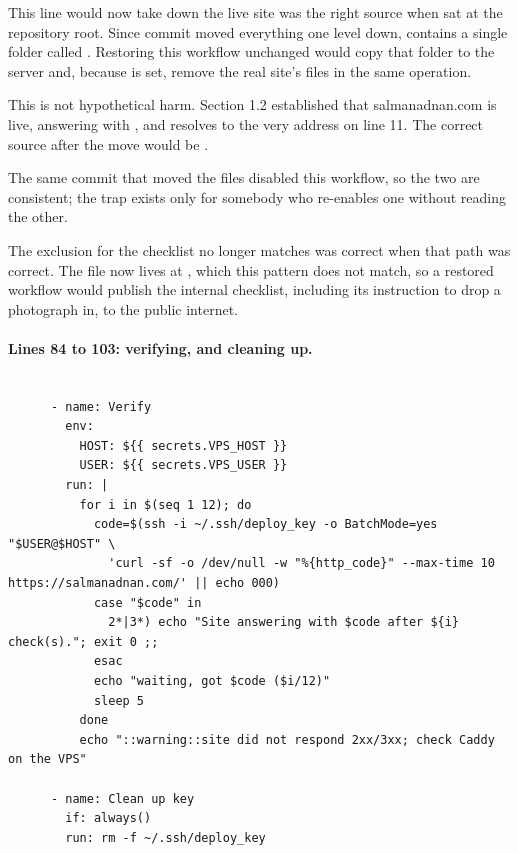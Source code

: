 \begin{honest}{This line would now take down the live site}
 was the right source when  sat at the repository root.
Since commit  moved everything one level down,  contains a
single folder called . Restoring this workflow unchanged
would copy that folder to the server and, because  is set, remove the
real site's files in the same operation.

This is not hypothetical harm. Section 1.2 established that salmanadnan.com is live,
answering with , and resolves to the very address on line 11. The correct
source after the move would be .

The same commit that moved the files disabled this workflow, so the two are
consistent; the trap exists only for somebody who re-enables one without reading the
other.
\end{honest}

\begin{honest}{The exclusion for the checklist no longer matches}
 was correct when that path was correct. The file
now lives at , which this pattern does
not match, so a restored workflow would publish the internal checklist, including
its instruction to drop a photograph in, to the public internet.
\end{honest}

\paragraph{Lines 84 to 103: verifying, and cleaning up.}

\begin{lstlisting}[firstnumber=84,caption={\file{deploy.yml.disabled}, lines 84--103}]

      - name: Verify
        env:
          HOST: ${{ secrets.VPS_HOST }}
          USER: ${{ secrets.VPS_USER }}
        run: |
          for i in $(seq 1 12); do
            code=$(ssh -i ~/.ssh/deploy_key -o BatchMode=yes "$USER@$HOST" \
              'curl -sf -o /dev/null -w "%{http_code}" --max-time 10 https://salmanadnan.com/' || echo 000)
            case "$code" in
              2*|3*) echo "Site answering with $code after ${i} check(s)."; exit 0 ;;
            esac
            echo "waiting, got $code ($i/12)"
            sleep 5
          done
          echo "::warning::site did not respond 2xx/3xx; check Caddy on the VPS"

      - name: Clean up key
        if: always()
        run: rm -f ~/.ssh/deploy_key
\end{lstlisting}

